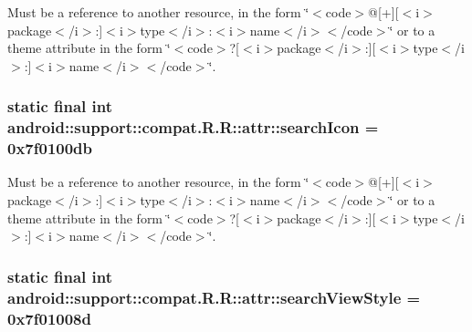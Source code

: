 Must be a reference to another resource, in the form \char`\"{}$<$code$>$@\mbox{[}+\mbox{]}\mbox{[}$<$i$>$package$<$/i$>$:\mbox{]}$<$i$>$type$<$/i$>$:$<$i$>$name$<$/i$>$$<$/code$>$\char`\"{} or to a theme attribute in the form \char`\"{}$<$code$>$?\mbox{[}$<$i$>$package$<$/i$>$:\mbox{]}\mbox{[}$<$i$>$type$<$/i$>$:\mbox{]}$<$i$>$name$<$/i$>$$<$/code$>$\char`\"{}. \hypertarget{classandroid_1_1support_1_1compat_1_1_r_1_1attr_44858419d7399efc3a06aec022104e68}{
\subsubsection[{searchIcon}]{\setlength{\rightskip}{0pt plus 5cm}static final int android::support::compat.R.R::attr::searchIcon = 0x7f0100db}}
\label{classandroid_1_1support_1_1compat_1_1_r_1_1attr_44858419d7399efc3a06aec022104e68}


Must be a reference to another resource, in the form \char`\"{}$<$code$>$@\mbox{[}+\mbox{]}\mbox{[}$<$i$>$package$<$/i$>$:\mbox{]}$<$i$>$type$<$/i$>$:$<$i$>$name$<$/i$>$$<$/code$>$\char`\"{} or to a theme attribute in the form \char`\"{}$<$code$>$?\mbox{[}$<$i$>$package$<$/i$>$:\mbox{]}\mbox{[}$<$i$>$type$<$/i$>$:\mbox{]}$<$i$>$name$<$/i$>$$<$/code$>$\char`\"{}. \hypertarget{classandroid_1_1support_1_1compat_1_1_r_1_1attr_e412a330f8022dda71a764b15c952988}{
\subsubsection[{searchViewStyle}]{\setlength{\rightskip}{0pt plus 5cm}static final int android::support::compat.R.R::attr::searchViewStyle = 0x7f01008d}}
\label{classandroid_1_1support_1_1compat_1_1_r_1_1attr_e412a330f8022dda71a764b15c952988}


